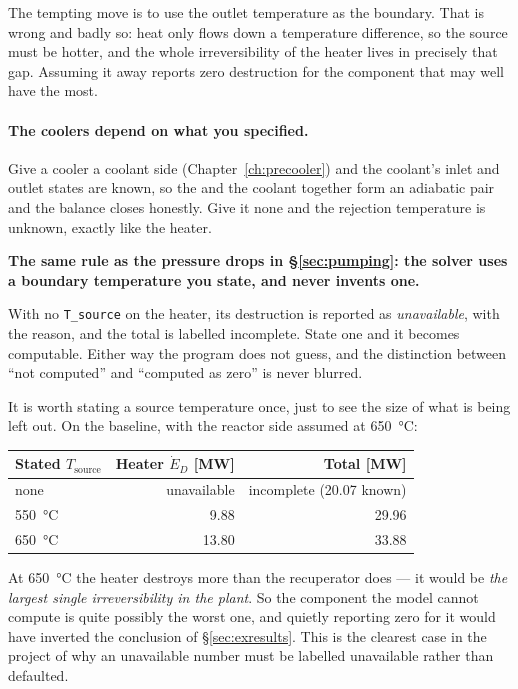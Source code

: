 \documentclass[11pt,a4paper]{report}
\newcommand{\code}[1]{\texttt{\small #1}}
\begin{document}
The tempting move is to use the  outlet temperature as the boundary.
That is wrong and badly so: heat only flows down a temperature difference,
so the source must be hotter, and the whole irreversibility of the heater
lives in precisely that gap. Assuming it away reports zero destruction for
the component that may well have the most.

\paragraph{The coolers depend on what you specified.} Give a cooler a
coolant side (Chapter~\ref{ch:precooler}) and the coolant's inlet and outlet
states are known, so the  and the coolant together form an adiabatic
pair and the balance closes honestly. Give it none and the rejection
temperature is unknown, exactly like the heater.

\begin{choicebox}
\textbf{The same rule as the pressure drops in \S\ref{sec:pumping}: the
solver uses a boundary temperature you state, and never invents one.}

With no \code{T\_source} on the heater, its destruction is reported as
\emph{unavailable}, with the reason, and the total is labelled incomplete.
State one and it becomes computable. Either way the program does not guess,
and the distinction between ``not computed'' and ``computed as zero'' is
never blurred.
\end{choicebox}

\noindent It is worth stating a source temperature once, just to see the
size of what is being left out. On the baseline, with the reactor side
assumed at \SI{650}{\celsius}:

\begin{center}
\begin{tabular}{@{}lrr@{}}
\toprule
Stated $T_{\text{source}}$ & Heater $\dot E_D$ [\si{\mega\watt}]
  & Total [\si{\mega\watt}] \\
\midrule
none                & unavailable & incomplete (\num{20.07} known) \\
\SI{550}{\celsius}  &  9.88 & 29.96 \\
\SI{650}{\celsius}  & 13.80 & 33.88 \\
\bottomrule
\end{tabular}
\end{center}

At \SI{650}{\celsius} the heater destroys more than the recuperator does
--- it would be \emph{the largest single irreversibility in the plant}. So
the component the model cannot compute is quite possibly the worst one, and
quietly reporting zero for it would have inverted the conclusion of
\S\ref{sec:exresults}. This is the clearest case in the project of why an
unavailable number must be labelled unavailable rather than defaulted.
\end{document}
